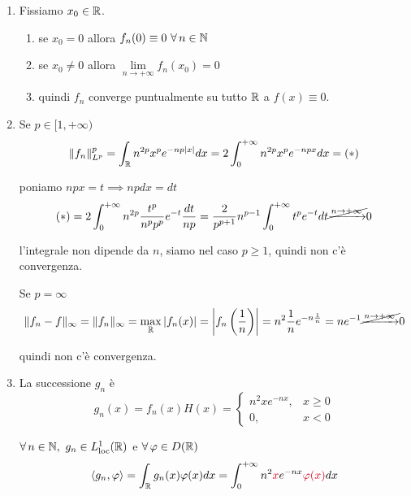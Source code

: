 \begin{enumerate}
\item Fissiamo $x_{0} \in \mathbb{R} $.
\begin{enumerate}
\item se $x_{0} = 0$ allora $f_{n}(0) \equiv 0\ \forall n\in \NN $
\item se $x_{0} \neq 0$ allora $\lim\limits _{n\rightarrow + \infty } f_{n}(x_{0}) = 0$
\item quindi $f_{n}$ converge puntualmente su tutto $\mathbb{R} $ a $f(x) \equiv 0$.
\end{enumerate}

\item Se $p\in [ 1, + \infty)$
\begin{equation*}
\Vert f_{n}\Vert ^{p}_{L^{p}} = \int _{\mathbb{R} } n^{2p} x^{p} e^{ - np| x| } dx = 2\int ^{ + \infty }_{0} n^{2p} x^{p} e^{ - npx} dx = (*)
\end{equation*}

poniamo $npx = t\implies npdx = dt$
\begin{equation*}
(*) = 2\int ^{ + \infty }_{0} n^{2p}\frac{t^{p}}{n^{p} p^{p}} e^{ - t}\frac{dt}{np} = \frac{2}{p^{p + 1}} n^{p - 1}\int ^{ + \infty }_{0} t^{p} e^{ - t} dt\cancel{\xrightarrow{n\rightarrow + \infty }} 0
\end{equation*}

l'integrale non dipende da $n$, siamo nel caso $p\geq 1$, quindi non c'è convergenza.

Se $p = \infty $
\begin{equation*}
\Vert f_{n} - f\Vert _{\infty } = \Vert f_{n}\Vert _{\infty } = \max_{\mathbb{R} }| f_{n}(x)| = \left| f_{n}\left(\frac{1}{n}\right)\right| = n^{2}\frac{1}{n} e^{ - n\frac{1}{n}} = ne^{ - 1}\cancel{\xrightarrow{n\rightarrow + \infty }} 0
\end{equation*}

quindi non c'è convergenza.
\item La successione $g_{n}$ è
\begin{equation*}
g_{n}(x) = f_{n}(x) H(x) = 
\begin{cases}
n^{2} xe^{ - nx} , & x\geq 0\\
0, & x < 0
\end{cases}
\end{equation*}

$\forall n\in \NN  ,\ g_{n} \in L^{1}_{\loc}(\RR)$ e $\forall \varphi \in D(\RR)$
\begin{equation*}
\langle g_{n} ,\varphi \rangle = \int _{\RR } g_{n}(x) \varphi (x) dx = \int ^{ + \infty }_{0} n^{2}\textcolor[rgb]{0.82,0.01,0.11}{x} e^{ - nx}\textcolor[rgb]{0.82,0.01,0.11}{\varphi }\textcolor[rgb]{0.82,0.01,0.11}{(}\textcolor[rgb]{0.82,0.01,0.11}{x}\textcolor[rgb]{0.82,0.01,0.11}{)} dx
\end{equation*}


\end{enumerate}

